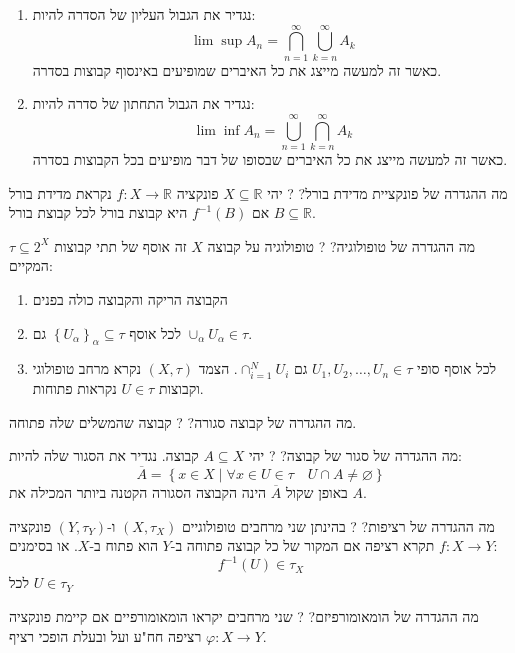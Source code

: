 \documentclass{tstextbook}
\begin{document}
\begin{enumerate}
  \item נגדיר את הגבול העליון של הסדרה להיות: 
$$\operatorname*{lim}\operatorname*{sup}A_{n}=\bigcap_{n=1}^{\infty}\bigcup_{k=n}^{\infty}A_{k}$$
כאשר זה למעשה מייצג את כל האיברים שמופיעים באינסוף קבוצות בסדרה.


  \item נגדיר את הגבול התחתון של סדרה להיות: 
$$\operatorname*{lim}\operatorname*{inf}A_{n}=\bigcup_{n=1}^{\infty}\bigcap_{k=n}^{\infty}A_{k}$$
כאשר זה למעשה מייצג את כל האיברים שבסופו של דבר מופיעים בכל הקבוצות בסדרה.


\end{enumerate}
מה ההגדרה של פונקציית מדידת בורל?
?
יהי \(X\subseteq \mathbb{R}\) פונקציה \(f:X\to \mathbb{R}\) נקראת מדידת בורל אם \(f^{-1}(B)\) היא קבוצת בורל לכל קבוצת בורל \(B\subseteq \mathbb{R}\).

מה ההגדרה של טופולוגיה?
?
טופולוגיה על קבוצה \(X\) זה אוסף של תתי קבוצות \(\tau \subseteq 2^{X}\) המקיים:

\begin{enumerate}
  \item הקבוצה הריקה והקבוצה כולה בפנים 


  \item לכל אוסף \(\left\{  U_{\alpha}  \right\}_{\alpha}\subseteq \tau\) גם \(\cup_{\alpha}U_{\alpha}\in \tau\). 


  \item לכל אוסף סופי \(U_{1},U_{2},\dots,U_{n}\in \tau\) גם \(\cap_{i=1}^{N}U_{i}\). 
הצמד \(\left( X,\tau \right)\) נקרא מרחב טופולוגי וקבוצות \(U \in \tau\) נקראות פתוחות.


\end{enumerate}
מה ההגדרה של קבוצה סגורה?
?
קבוצה שהמשלים שלה פתוחה.

מה ההגדרה של סגור של קבוצה?
?
יהי \(A\subseteq X\) קבוצה. נגדיר את הסגור שלה להיות:
$$\overline{A} = \left\{   x \in X \mid \forall x \in U \in \tau \quad U \cap A \neq \varnothing  \right\}$$
באופן שקול \(\overline{A}\) הינה הקבוצה הסגורה הקטנה ביותר המכילה את \(A\).

מה ההגדרה של רציפות?
?
בהינתן שני מרחבים טופולוגיים \(\left( X,\tau_{X} \right)\) ו-\(\left( Y,\tau_{Y} \right)\) פונקציה \(f:X\to Y\) תקרא רציפה אם המקור של כל קבוצה פתוחה ב-\(Y\) הוא פתוח ב-\(X\). או בסימנים:
$$f^{-1} (U) \in \tau_{X}$$
לכל \(U \in \tau_{Y}\)

מה ההגדרה של הומאומורפיזם?
?
שני מרחבים יקראו הומאומורפיים אם קיימת פונקציה \(\varphi:X\to Y\) רציפה חח"ע ועל ובעלת הופכי רציף.
\end{document}
